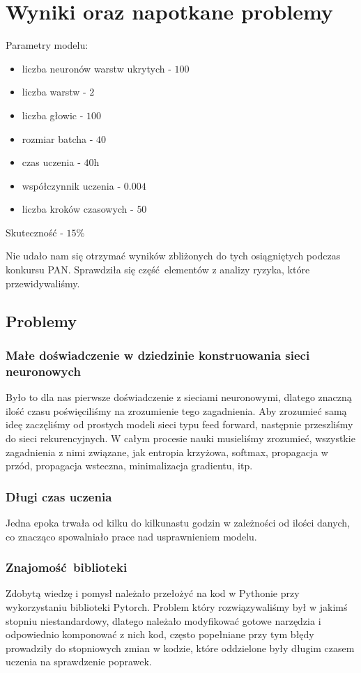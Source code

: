 \newpage
\section{Wyniki oraz napotkane problemy}

Parametry modelu:
\begin{itemize}
	  \item liczba neuronów warstw ukrytych - $100$
	  \item liczba warstw - $2$
	  \item liczba głowic - $100$
	  \item rozmiar batcha - $40$
	  \item czas uczenia - $40$h
	  \item współczynnik uczenia - $0.004$
	  \item liczba kroków czasowych - $50$
	\end{itemize}

Skuteczność - $15\%$

Nie udało nam się otrzymać wyników zbliżonych do tych osiągniętych podczas konkursu PAN. Sprawdziła się
część elementów z analizy ryzyka, które przewidywaliśmy.

\subsection{Problemy}
\subsubsection{Małe doświadczenie w dziedzinie konstruowania sieci neuronowych}
Było to dla nas pierwsze doświadczenie z sieciami neuronowymi, dlatego znaczną ilość czasu poświęciliśmy na
zrozumienie tego zagadnienia. Aby zrozumieć samą ideę zaczęliśmy od prostych modeli sieci typu feed forward,
następnie przeszliśmy do sieci rekurencyjnych. W całym procesie nauki musieliśmy zrozumieć,
wszystkie zagadnienia z nimi związane, jak entropia krzyżowa, softmax, propagacja w przód, propagacja wsteczna,
minimalizacja gradientu, itp.

\subsubsection{Długi czas uczenia}
Jedna epoka trwała od kilku do kilkunastu godzin w zależności od ilości danych, co znacząco spowalniało
prace nad usprawnieniem modelu.

\subsubsection{Znajomość biblioteki}
Zdobytą wiedzę i pomysł należało przełożyć na kod w Pythonie przy wykorzystaniu biblioteki Pytorch.
Problem który rozwiązywaliśmy był w jakimś stopniu niestandardowy, dlatego należało modyfikować
gotowe narzędzia i odpowiednio komponować z nich kod, często popełniane przy tym błędy prowadziły
do stopniowych zmian w kodzie, które oddzielone były długim czasem uczenia na sprawdzenie poprawek.

